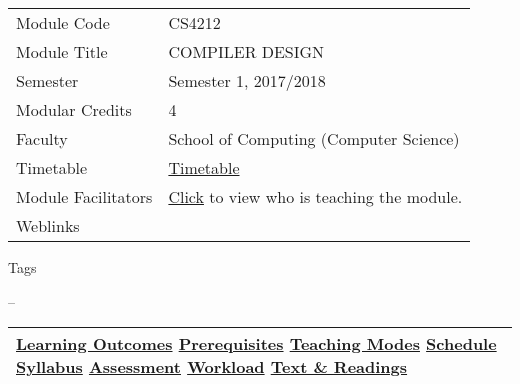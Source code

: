 \hypertarget{ctl00_ctl00_ContentPlaceHolder1_ContentPlaceHolder1_LV_itemPlaceholderContainer}{}
\begin{longtable}[]{@{}ll@{}}
\toprule
\protect\hypertarget{ctl00_ctl00_ContentPlaceHolder1_ContentPlaceHolder1_LV_ctrl0_txtCode}{}{Module
Code} &
\protect\hypertarget{ctl00_ctl00_ContentPlaceHolder1_ContentPlaceHolder1_LV_ctrl0_lcCode}{}{CS4212}\tabularnewline
\protect\hypertarget{ctl00_ctl00_ContentPlaceHolder1_ContentPlaceHolder1_LV_ctrl0_lcCourse}{}{Module
Title} &
\protect\hypertarget{ctl00_ctl00_ContentPlaceHolder1_ContentPlaceHolder1_LV_ctrl0_lcCourseName}{}{COMPILER
DESIGN}\tabularnewline
\protect\hypertarget{ctl00_ctl00_ContentPlaceHolder1_ContentPlaceHolder1_LV_ctrl0_lcSemester}{}{Semester}
&
\protect\hypertarget{ctl00_ctl00_ContentPlaceHolder1_ContentPlaceHolder1_LV_ctrl0_lcSem}{}{Semester
1, 2017/2018}\tabularnewline
\protect\hypertarget{ctl00_ctl00_ContentPlaceHolder1_ContentPlaceHolder1_LV_ctrl0_lcModCredit}{}{Modular
Credits} &
\protect\hypertarget{ctl00_ctl00_ContentPlaceHolder1_ContentPlaceHolder1_LV_ctrl0_lcModC}{}{4}\tabularnewline
\protect\hypertarget{ctl00_ctl00_ContentPlaceHolder1_ContentPlaceHolder1_LV_ctrl0_lcFaculty}{}{Faculty}
&
\protect\hypertarget{ctl00_ctl00_ContentPlaceHolder1_ContentPlaceHolder1_LV_ctrl0_lcFac}{}{School
of Computing (Computer Science)}\tabularnewline
\protect\hypertarget{ctl00_ctl00_ContentPlaceHolder1_ContentPlaceHolder1_LV_ctrl0_Label1}{}{Timetable}
&
\protect\hypertarget{ctl00_ctl00_ContentPlaceHolder1_ContentPlaceHolder1_LV_ctrl0_Span1}{}{\href{javascript:void(0);}{Timetable}}\tabularnewline
\protect\hypertarget{ctl00_ctl00_ContentPlaceHolder1_ContentPlaceHolder1_LV_ctrl0_Label6}{}{Module
Facilitators} &
\protect\hypertarget{ctl00_ctl00_ContentPlaceHolder1_ContentPlaceHolder1_LV_ctrl0_Span2}{}{\href{list_lecturers.aspx?CourseID=ee88bff2-5c3e-4ae6-ac74-a9d7d8a1e484\&ClickFrom=}{Click}
to view who is teaching the module.}\tabularnewline
\protect\hypertarget{ctl00_ctl00_ContentPlaceHolder1_ContentPlaceHolder1_LV_ctrl0_LabelCtrl1}{}{Weblinks}
&\tabularnewline
\bottomrule
\end{longtable}

\protect\hypertarget{ctl00_ctl00_ContentPlaceHolder1_ContentPlaceHolder1_LV_ctrl0_Label4}{}{Tags}

\protect\hypertarget{ctl00_ctl00_ContentPlaceHolder1_ContentPlaceHolder1_LV_ctrl0_lblTags}{}{--}

\begin{longtable}[]{@{}l@{}}
\toprule
\protect\hypertarget{ctl00_ctl00_ContentPlaceHolder1_ContentPlaceHolder1_lblSectionMiddle}{}{\protect\hyperlink{Learningux5cux2520Outcomes}{Learning
Outcomes} \textbar{} \protect\hyperlink{Prerequisites}{Prerequisites}
\textbar{} \protect\hyperlink{Teachingux5cux2520Modes}{Teaching Modes}
\textbar{} \protect\hyperlink{Schedule}{Schedule} \textbar{}
\protect\hyperlink{Syllabus}{Syllabus} \textbar{}
\protect\hyperlink{Assessment}{Assessment} \textbar{}
\protect\hyperlink{Workload}{Workload} \textbar{}
\protect\hyperlink{References}{Text \& Readings}}\tabularnewline
\bottomrule
\end{longtable}


